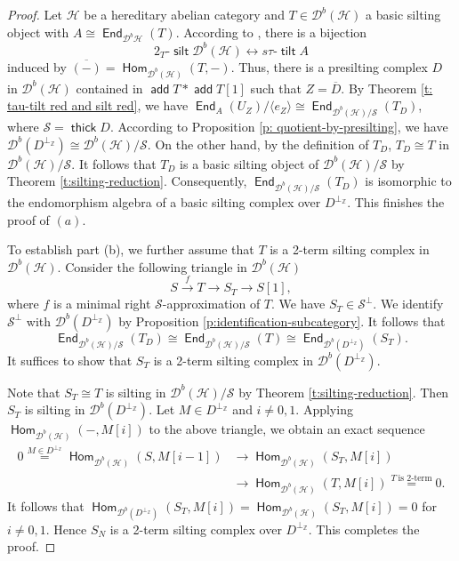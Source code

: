 \documentclass[12pt,a4paper,reqno]{amsart}
\theoremstyle{definition}
\newcommand{\opname}[1]{\operatorname{\mathsf{#1}}}
\newcommand{\add}{\opname{add}\nolimits}
\newcommand{\der}{\cd}
\newcommand{\thick}{\opname{thick}}
\newcommand{\Hom}{\opname{Hom}}
\newcommand{\End}{\opname{End}}
\newcommand{\cd}{{\mathcal D}}
\begin{document}
\begin{proof}
Let $\mathcal{H}$ be a hereditary abelian category and $T\in \der^b(\mathcal{H})$ a basic silting object with $A\cong \End_{\der^b{\mathcal{H}}}(T)$.
 According to \cite[Theorem 4.5]{IJY}, there is a bijection \[2_T\text{-}\opname{silt} \der^b(\mathcal{H}) \leftrightarrow s\tau \text{-}\opname{tilt} A\] induced by $\overline{(-)} = \Hom_{\der^b(\mathcal{H})} (T, -)$. Thus, there is a presilting complex $D$ in $\der^b(\mathcal{H})$ contained in $\add T * \add T [1]$ such that $Z = \overline{D}$. By Theorem \ref{t: tau-tilt red and silt red}, we have $\End_A (U_{Z}) / \langle e_Z \rangle \cong \End_{\der^b(\mathcal{H})/\mathcal{S}} (T_D)$, where $\mathcal{S} = \thick D$. According to Proposition \ref{p: quotient-by-presilting}, we have $\der^b(D^{\perp_{\mathbb{Z}}})\cong \der^b(\mathcal{H})/\mathcal{S}$.  On the other hand, by the definition of $T_D$, $T_D\cong T$ in $\der^b(\mathcal{H})/\mathcal{S}$. It follows that $T_D$ is a basic silting object of $\der^b(\mathcal{H})/\mathcal{S}$ by Theorem \ref{t:silting-reduction}. Consequently, $\End_{\der^b(\mathcal{H})/\mathcal{S}}(T_D)$ is isomorphic to the endomorphism algebra of a basic silting complex over $D^{\perp_{\mathbb{Z}}}$. This finishes the proof of $(a)$.

 
To establish part (b), we further assume that $T$ is a 2-term silting complex in $\der^b(\mathcal{H})$. 
Consider the following triangle in $\der^b(\mathcal{H})$
\[
S\xrightarrow{f} T\to S_T\to S[1],
\]
where $f$ is a minimal right $\mathcal{S}$-approximation of $T$. We have $S_T\in \mathcal{S}^\perp$.
We identify $\mathcal{S}^\perp$ with $\der^b(D^{\perp_\mathbb{Z}})$ by Proposition \ref{p:identification-subcategory}. It follows that 
\[
\End_{\der^b(\mathcal{H})/\mathcal{S}}(T_D)\cong \End_{\der^b(\mathcal{H})/\mathcal{S}}(T)\cong \End_{\der^b(D^{\perp_\mathbb{Z}})}(S_T).
\]
It suffices to show that $S_T$ is a 2-term silting complex in $\der^b(D^{\perp_\mathbb{Z}})$.

Note that $S_T \cong T$ is silting in $\der^b(\mathcal{H})/\mathcal{S}$ by Theorem \ref{t:silting-reduction}. Then $S_T$ is silting in $\der^b(D^{\perp_\mathbb{Z}})$. Let $M\in D^{\perp_\mathbb{Z}}$ and $i\neq 0,1$. 
 Applying $\Hom_{\der^b(\mathcal{H})} (-, M[i])$ to the above triangle, we obtain an exact sequence
\begin{align*}
0 \overset{M \in D^{\perp_{\mathbb{Z}}}}{=} \Hom_{\der^b(\mathcal{H})} (S, M[i - 1]) &\to \Hom_{\der^b(\mathcal{H})} (S_T, M[i])\\
 &\to \Hom_{\der^b(\mathcal{H})} (T, M[i]) \overset{T~\text{is 2-term}}{=} 0.
\end{align*}
It follows that $\Hom_{\der^b(D^{\perp_\mathbb{Z}})} (S_T, M[i])=\Hom_{\der^b(\mathcal{H})} (S_T, M[i])=0$ for $i\neq 0,1$. Hence $S_N$ is a 2-term silting complex over $D^{\perp_\mathbb{Z}}$. This completes the proof.

\end{proof}
\end{document}
